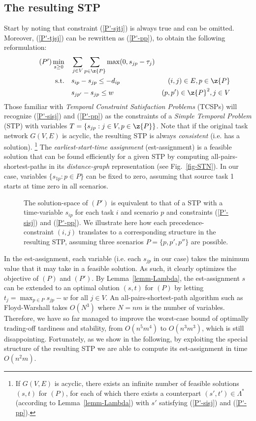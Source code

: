 \subsection{The resulting STP}

Start by noting that constraint (\ref{P'-sjtj}) is always true and can be omitted.
Moreover, (\ref{P'-tjsj}) can be rewritten as (\ref{P'-pp}), to obtain the following reformulation:
\begin{align}
	\tag{$P'$}
	\min_{s\geq 0} \quad 	& \sum_{j\in V} \sum_{p\in \z{P}} \max(0, s_{jp} - \tau_j)		& \\
	\textrm{s.t.}\quad	&	s_{ip} - s_{jp} \leq - d_{ip}	& (i,j) \in E, p \in \z{P} \label{P'-sisj} \\
						&	s_{jp'} - s_{jp} \leq w		& (p, p') \in \z{P}^2, j\in V \label{P'-pp}
\end{align}
Those familiar with \emph{Temporal Constraint Satisfaction Problems} (TCSPs) \cite{dechter1991} will 
recognize (\ref{P'-sisj}) and (\ref{P'-pp}) as the constraints of a \emph{Simple Temporal Problem} (STP) 
with variables $T=\{s_{jp}: j \in V, p\in \z{P}\}$.
Note that if the original task network $G(V,E)$ is acyclic, the resulting STP is always \emph{consistent} (i.e. has a solution).%
\footnote{If $G(V,E)$ is acyclic, there exists an infinite number of feasible solutions $(s,t)$ for $(P)$,
for each of which there exists a counterpart $(s',t')\in \Lambda^*$ (according to Lemma~\ref{lemm-Lambda}) 
with $s'$ satisfying (\ref{P'-sisj}) and (\ref{P'-pp}).}%
The \emph{earliest-start-time assignment} (est-assignment) is a feasible solution that can be found efficiently
for a given STP by computing all-pairs-shortest-paths in its \emph{distance-graph} representation (see Fig.~\ref{fig-STN}).
In our case, variables $\{s_{1p}: p \in P\}$ can be fixed to zero, assuming that source task 1 starts at time zero in all scenarios.

\begin{figure}
	\centering
	
	\caption{The solution-space of $(P')$ is equivalent to that of a STP with a time-variable
	$s_{ip}$ for each task $i$ and scenario $p$ and constraints (\ref{P'-sisj}) and (\ref{P'-pp}).
	We illustrate here how each precedence-constraint $(i,j)$ translates to a corresponding structure in the resulting STP,
	assuming three scenarios $P=\{p,p', p''\}$ are possible.}
\end{figure}

In the est-assignment, each variable (i.e. each $s_{jp}$ in our case) takes the minimum value that it may take in a feasible solution.
As such, it clearly optimizes the objective of $(P)$ and $(P')$.
By Lemma~\ref{lemm-Lambda}, the est-assignment $s$ can be extended to an optimal olution $(s,t)$ for $(P)$ by letting 
$t_j = \max_{p\in P} s_{jp} - w$ for all $j\in V$.
An all-pairs-shortest-path algorithm such as Floyd-Warshall \cite{} takes $O(N^3)$ where $N=n m$ is the number of variables.
Therefore, we have so far managed to improve the worst-case bound of optimally trading-off tardiness and stability, 
from $O(n^5m^4)$ to $O(n^3m^3)$, which is still disappointing.
Fortunately, as we show in the following, by exploiting the special structure of the resulting STP 
we are able to compute its est-assignment in time $O(n^2m)$.
 
